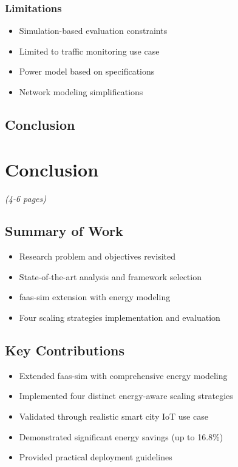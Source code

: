 \documentclass[12pt,a4paper]{report}
\begin{document}
\subsection{Limitations}
\begin{itemize}[leftmargin=1cm]
    \item Simulation-based evaluation constraints
    \item Limited to traffic monitoring use case
    \item Power model based on specifications
    \item Network modeling simplifications
\end{itemize}

\section{Conclusion}


\chapter{Conclusion}
\textit{(4-6 pages)}

\section{Summary of Work}
\begin{itemize}[leftmargin=1cm]
    \item Research problem and objectives revisited
    \item State-of-the-art analysis and framework selection
    \item faas-sim extension with energy modeling
    \item Four scaling strategies implementation and evaluation
\end{itemize}

\section{Key Contributions}
\begin{itemize}[leftmargin=1cm]
    \item Extended faas-sim with comprehensive energy modeling
    \item Implemented four distinct energy-aware scaling strategies
    \item Validated through realistic smart city IoT use case
    \item Demonstrated significant energy savings (up to 16.8\%)
    \item Provided practical deployment guidelines
\end{itemize}
\end{document}

